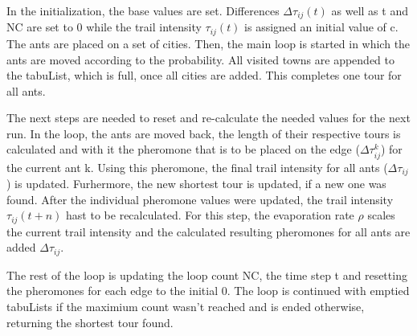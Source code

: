 In the initialization, the base values are set.
Differences $\Delta\tau_{ij}(t)$ as well as t and NC are set to 0 while the trail intensity $\tau_{ij}(t)$ is assigned an initial value of c.
The ants are placed on a set of cities.
Then, the main loop is started in which the ants are moved according to the probability.
All visited towns are appended to the tabuList, which is full, once all cities are added.
This completes one tour for all ants.

The next steps are needed to reset and re-calculate the needed values for the next run.
In the loop, the ants are moved back, the length of their respective tours is calculated and with it the pheromone that is to be placed on the edge ($\Delta\tau_{ij}^k$) for the current ant k.
Using this pheromone, the final trail intensity for all ants ($\Delta\tau_{ij}$) is updated.
Furhermore, the new shortest tour is updated, if a new one was found.
After the individual pheromone values were updated, the trail intensity $\tau_{ij}(t+n)$ hast to be recalculated. 
For this step, the evaporation rate $\rho$ scales the current trail intensity and the calculated resulting pheromones for all ants are added $\Delta\tau_{ij}$.

The rest of the loop is updating the loop count NC, the time step t and resetting the pheromones for each edge to the initial 0.
The loop is continued with emptied tabuLists if the maximium count wasn't reached and is ended otherwise, returning the shortest tour found.


